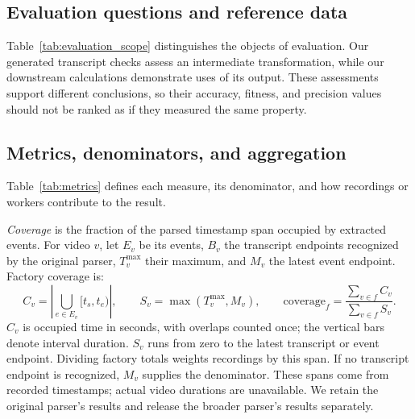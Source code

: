 \subsection{Evaluation questions and reference data}
Table~\ref{tab:evaluation_scope} distinguishes the objects of evaluation. Our generated transcript checks assess an intermediate transformation, while our downstream calculations demonstrate uses of its output. These assessments support different conclusions, so their accuracy, fitness, and precision values should not be ranked as if they measured the same property.

\subsection{Metrics, denominators, and aggregation}
\label{sec:metrics}
Table~\ref{tab:metrics} defines each measure, its denominator, and how recordings or workers contribute to the result.

\emph{Coverage} is the fraction of the parsed timestamp span occupied by extracted events. For video $v$, let $E_v$ be its events, $B_v$ the transcript endpoints recognized by the original parser, $T_v^{\max}$ their maximum, and $M_v$ the latest event endpoint. Factory coverage is:
\begin{equation}
 C_v=\left|\bigcup_{e\in E_v}[t_s,t_e)\right|,\qquad S_v=\max(T_v^{\max},M_v),\qquad
 \mathrm{coverage}_f=\frac{\sum_{v\in f}C_v}{\sum_{v\in f}S_v}.
\end{equation}
$C_v$ is occupied time in seconds, with overlaps counted once; the vertical bars denote interval duration. $S_v$ runs from zero to the latest transcript or event endpoint. Dividing factory totals weights recordings by this span. If no transcript endpoint is recognized, $M_v$ supplies the denominator. These spans come from recorded timestamps; actual video durations are unavailable. We retain the original parser's results and release the broader parser's results separately.

